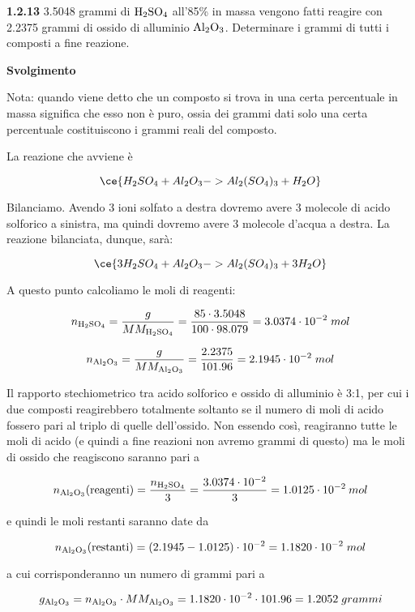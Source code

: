 \vspace{0.2cm}\textbf{1.2.13} 3.5048 grammi di $\rm H_2SO_4$ all'85\% in massa vengono fatti reagire con 2.2375 grammi di ossido di alluminio $\rm Al_2O_3$. Determinare i grammi di tutti i composti a fine reazione.

\vspace{0.2cm}\large\textbf{Svolgimento}\normalsize

\vspace{0.2cm}Nota: quando viene detto che un composto si trova in una certa percentuale in massa significa che esso non è puro, ossia dei grammi dati solo una certa percentuale costituiscono i grammi reali del composto.

\vspace{0.2cm}La reazione che avviene è

$$\ce{H_2SO_4 + Al_2O_3 -> Al_2(SO_4)_3 + H_2O}$$

Bilanciamo. Avendo 3 ioni solfato a destra dovremo avere 3 molecole di acido solforico a sinistra, ma quindi dovremo avere 3 molecole d'acqua a destra. La reazione bilanciata, dunque, sarà:

$$\ce{3H_2SO_4 + Al_2O_3 -> Al_2(SO_4)_3 + 3H_2O}$$

A questo punto calcoliamo le moli di reagenti:

$$n_{\rm H_2SO_4}=\frac{g}{MM_{\rm H_2SO_4}}
=\frac{85 \cdot 3.5048}{100 \cdot 98.079}=3.0374 \cdot 10^{-2}\;mol$$

$$n_{\rm Al_2O_3}=\frac{g}{MM_{\rm Al_2O_3}}
=\frac{2.2375}{101.96}
=2.1945 \cdot 10^{-2}\;mol$$

Il rapporto stechiometrico tra acido solforico e ossido di alluminio è 3:1, per cui i due composti reagirebbero totalmente soltanto se il numero di moli di acido fossero pari al triplo di quelle dell'ossido. Non essendo così, reagiranno tutte le moli di acido (e quindi a fine reazioni non avremo grammi di questo) ma le moli di ossido che reagiscono saranno pari a

$$n_{\rm Al_2O_3}(\text{reagenti})
=\frac{n_{\rm H_2SO_4}}{3}
=\frac{3.0374 \cdot 10^{-2}}{3}
=1.0125 \cdot 10^{-2}\:mol$$

e quindi le moli restanti saranno date da

$$n_{\rm Al_2O_3}(\text{restanti})
=(2.1945 - 1.0125) \cdot 10^{-2}
=1.1820 \cdot 10^{-2}\;mol$$

a cui corrisponderanno un numero di grammi pari a

$$g_{\rm Al_2O_3}=n_{\rm Al_2O_3} \cdot MM_{\rm Al_2O_3}
=1.1820 \cdot 10^{-2} \cdot 101.96
=1.2052\;grammi$$

